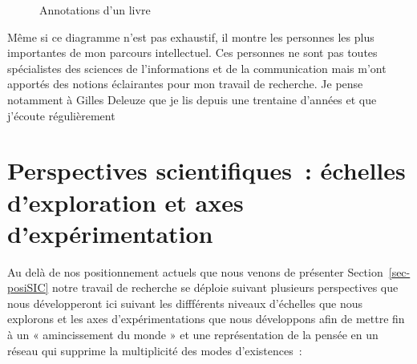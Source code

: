 \documentclass[
  a4paper,
  DIV=11,
  numbers=noendperiod]{scrreprt}
\begin{document}
\begin{figure}


\caption{\label{fig-annotationsLivre}Annotations d'un livre}

\end{figure}%

Même si ce diagramme n'est pas exhaustif, il montre les personnes les
plus importantes de mon parcours intellectuel. Ces personnes ne sont pas
toutes spécialistes des sciences de l'informations et de la
communication mais m'ont apportés des notions éclairantes pour mon
travail de recherche. Je pense notamment à Gilles Deleuze que je lis
depuis une trentaine d'années et que j'écoute régulièrement

\chapter{Perspectives scientifiques~: échelles d'exploration et axes
d'expérimentation}\label{sec-visees}

Au delà de nos positionnement actuels que nous venons de présenter
Section~\ref{sec-posiSIC} notre travail de recherche se déploie suivant
plusieurs perspectives que nous développeront ici suivant les
diffférents niveaux d'échelles que nous explorons et les axes
d'expérimentations que nous développons afin de mettre fin à un «
amincissement du monde » et une représentation de la pensée en un réseau
qui supprime la multiplicité des modes d'existences~:
\end{document}
